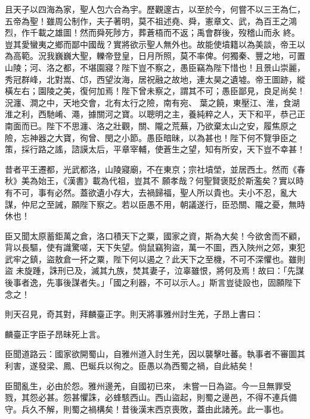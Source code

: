 \begin{pinyinscope}
 且天子以四海為家，聖人包六合為宇。歷觀邃古，以至於今，何嘗不以三王為仁，五帝為聖！雖周公制作，夫子著明，莫不祖述堯、舜，憲章文、武，為百王之鴻烈，作千載之雄圖！然而舜死陟方，葬蒼梧而不返；禹會群後，歿稽山而永
 終。豈其愛蠻夷之鄉而鄙中國哉？實將欲示聖人無外也。故能使墳籍以為美談，帝王以為高範。況我巍巍大聖，轢帝登皇，日月所照，莫不率俾。何獨秦、豐之地，可置山陵；河、洛之都，不堪園寢？陛下豈不察之，愚臣竊為陛下惜也！且景山崇麗，秀冠群峰，北對嵩、邙，西望汝海，居祝融之故地，連太昊之遺墟。帝王圖跡，縱橫左右；園陵之美，復何加焉！陛下曾未察之，謂其不可；愚臣鄙見，良足尚矣！況瀍、澗之中，天地交會，北有太行之險，南有宛、
 葉之饒，東壓江、淮，食湖淮之利，西馳崤、澠，據關河之寶。以聰明之主，養純粹之人，天下和平，恭己正南面而已。陛下不思瀍、洛之壯觀，關、隴之荒蕪，乃欲棄太山之安，履焦原之險，忘神器之大寶，徇曾、閔之小節。愚臣暗昧，以為甚也！陛下何不覽爭臣之策，採行路之謠，諮謨太后，平章宰輔，使蒼生之望，知有所安，天下豈不幸甚！



 昔者平王遷都，光武都洛，山陵寢廟，不在東京；宗社墳塋，並居西土。然而《春秋》美為始王，《漢書》載為代祖，豈其不
 願孝哉？何聖賢褒貶於斯濫矣？實以時有不可，事有必然。蓋欲遺小存大，去禍歸福，聖人所以貴也。夫小不忍，亂大謀，仲尼之至誡，願陛下察之。若以臣愚不用，朝議遂行，臣恐關、隴之憂，無時休也！



 臣又聞太原蓄鉅萬之倉，洛口積天下之粟，國家之資，斯為大矣！今欲舍而不顧，背以長驅，使有識驚嗟，天下失望。倘鼠竊狗盜，萬一不圖，西入陜州之郊，東犯武牢之鎮，盜敖倉一抔之粟，陛下何以遏之？此天下之至機，不可不深懼也。雖則盜
 未旋踵，誅刑已及，滅其九族，焚其妻子，泣辜雖恨，將何及焉！故曰：「先謀後事者逸，先事後謀者失。」「國之利器，不可以示人。」斯言豈徒設也，固願陛下念之！



 則天召見，奇其對，拜麟臺正字。則天將事雅州討生羌，子昂上書曰：



 麟臺正字臣子昂昧死上言。



 臣聞道路云：國家欲開蜀山，自雅州道入討生羌，因以襲擊吐蕃。執事者不審圖其利害，遂發梁、鳳、巴蜒兵以徇之。臣愚以為西蜀之禍，自此結矣！



 臣聞亂生，必由於怨。雅州邊羌，自國初已來，
 未嘗一日為盜。今一旦無罪受戮，其怨必甚。怨甚懼誅，必蜂駭西山。西山盜起，則蜀之邊邑，不得不連兵備守。兵久不解，則蜀之禍構矣！昔後漢末西京喪敗，蓋由此諸羌。此一事也。




\end{pinyinscope}
